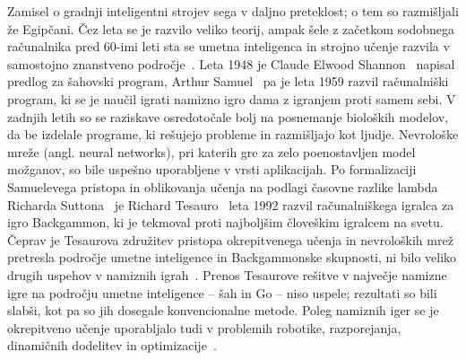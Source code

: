 \documentclass[a4paper, oneside, 12pt]{report}
\begin{document}
Zamisel o gradnji inteligentni strojev sega v daljno preteklost; o tem so razmišljali že Egipčani. Čez leta se je razvilo veliko teorij, ampak šele z začetkom sodobnega računalnika pred 60-imi leti sta se umetna inteligenca in strojno učenje razvila v samostojno znanstveno področje~\cite{TDANNForStrategicControlProblems}. Leta 1948 je Claude Elwood Shannon~\cite{AMathematicalTheoryOfCommunication} napisal predlog za šahovski program, Arthur Samuel~\cite{SomeStudiesInMachineLearningUsingTheGameOfCheckers} pa je leta 1959 razvil računalniški program, ki se je naučil igrati namizno igro dama z igranjem proti samem sebi. V zadnjih letih so se raziskave osredotočale bolj na posnemanje bioloških modelov, da be izdelale programe, ki rešujejo probleme in razmišljajo kot ljudje. Nevrološke mreže (angl. neural networks), pri katerih gre za zelo poenostavljen model možganov, so bile uspešno uporabljene v vrsti aplikacijah. Po formalizaciji Samuelevega pristopa in oblikovanja učenja na podlagi časovne razlike lambda Richarda Suttona~\cite{LearningToPredictByTheMethodsOfTemporalDifference} je Richard Tesauro~\cite{PracticalIssuesInTemporalDifferenceLearning} leta 1992 razvil računalniškega igralca za igro Backgammon, ki je tekmoval proti najboljšim človeškim igralcem na svetu. Čeprav je Tesaurova združitev pristopa okrepitvenega učenja in nevroloških mrež pretresla področje umetne inteligence in Backgammonske skupnosti, ni bilo veliko drugih uspehov v namiznih igrah~\cite{PlayingRiskAversiveGoOnALargeBoardUsingLocalNeuralNetworkPositionEvaluationFunctions, StrategyAcquisitionForTheGameOthelloBasedOnReinforcementLearning, LearningToEvaluateGoPositionsViaTemporalDifferenceMethods}. Prenos Tesaurove rešitve v največje namizne igre na področju umetne inteligence -- šah in Go -- niso uspele; rezultati so bili slabši, kot pa so jih dosegale konvencionalne metode. Poleg namiznih iger se je okrepitveno učenje uporabljalo tudi v problemih robotike, razporejanja, dinamičnih dodelitev in optimizacije~\cite{ReinforcementLearningAnIntroduction}.

\end{document}
